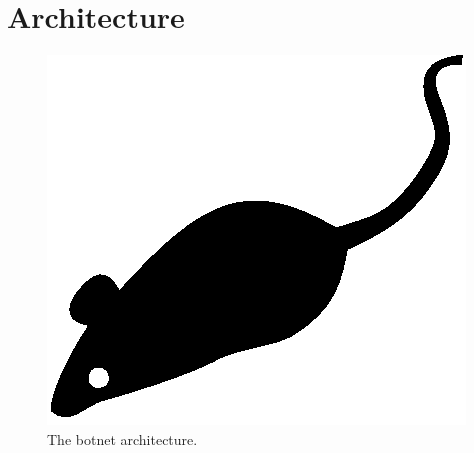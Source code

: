 \section{Architecture}
\label{sec:architecture}

\lipsum[1]

\begin{figure}[tp]
	\centering
	\includegraphics{./fig/acmlarge-mouse}
	\caption{The botnet architecture.}
		\label{fig:botnet-architecture}
\end{figure}

\lipsum[1]

\lipsum[1]
